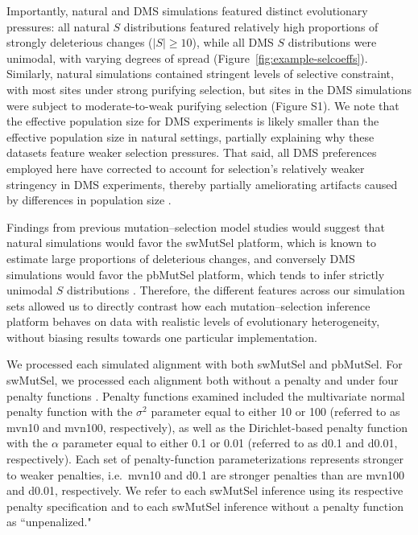 \documentclass[11pt]{article}
\begin{document}
Importantly, natural and DMS simulations featured distinct evolutionary pressures: all natural $S$ distributions featured relatively high proportions of strongly deleterious changes ($|S|\geq10$), while all DMS $S$ distributions were unimodal, with varying degrees of spread (Figure~\ref{fig:example-selcoeffs}). Similarly, natural simulations contained stringent levels of selective constraint, with most sites under strong purifying selection, but sites in the DMS simulations were subject to moderate-to-weak purifying selection (Figure S1). We note that the effective population size for DMS experiments is likely smaller than the effective population size in natural settings, partially explaining why these datasets feature weaker selection pressures. That said, all DMS preferences employed here have corrected to account for selection's relatively weaker stringency in DMS experiments, thereby partially ameliorating artifacts caused by differences in population size \citep{Bloom2014b,Bloom2016}.

Findings from previous mutation--selection model studies would suggest that natural simulations would favor the swMutSel platform, which is known to estimate large proportions of deleterious changes, and conversely DMS simulations would favor the pbMutSel platform, which tends to infer strictly unimodal $S$ distributions \citep{Rodrigueetal2010,Tamurietal2012,Rodrigue2013,Tamurietal2014}. Therefore, the different features across our simulation sets allowed us to directly contrast how each mutation--selection inference platform behaves on data with realistic levels of evolutionary heterogeneity, without biasing results towards one particular implementation.

We processed each simulated alignment with both swMutSel and pbMutSel. For swMutSel, we processed each alignment both without a penalty and under four penalty functions \citep{Tamurietal2014}. Penalty functions examined included the multivariate normal penalty function with the $\sigma^2$ parameter equal to either 10 or 100 (referred to as  mvn10 and mvn100, respectively), as well as the Dirichlet-based penalty function with the $\alpha$ parameter equal to either 0.1 or 0.01 (referred to as d0.1 and d0.01, respectively). Each set of penalty-function parameterizations represents stronger to weaker penalties, i.e.\ mvn10 and d0.1 are stronger penalties than are mvn100 and d0.01, respectively. We refer to each swMutSel inference using its respective penalty specification and to each swMutSel inference without a penalty function as ``unpenalized."
\end{document}
